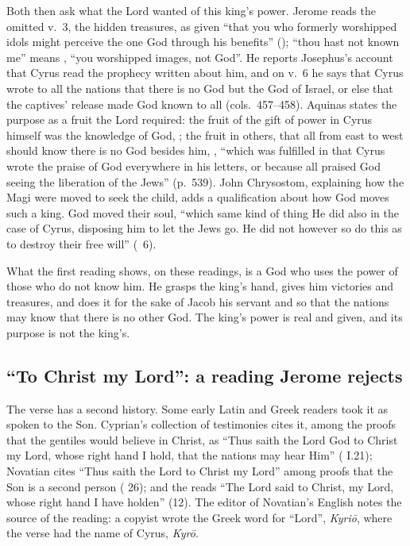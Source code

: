 Both then ask what the Lord wanted of this king's power. Jerome reads the
omitted v.~3, the hidden treasures, as given ``that you who formerly
worshipped idols might perceive the one God through his benefits''
(); ``thou
hast not known me'' means , ``you
worshipped images, not God''. He reports Josephus's account that Cyrus read
the prophecy written about him, and on v.~6 he says that Cyrus wrote to all
the nations that there is no God but the God of Israel, or else that the
captives' release made God known to all (cols.~457--458). Aquinas states the
purpose as a fruit the Lord required: the fruit of the gift of power in Cyrus
himself was the knowledge of God, ; the fruit in
others, that all from east to west should know there is no God besides him,
,
``which was fulfilled in that Cyrus wrote the praise of God everywhere in his
letters, or because all praised God seeing the liberation of the Jews''
(p.~539). John Chrysostom, explaining how the Magi were moved to seek the
child, adds a qualification about how God moves such a king. God moved their
soul, ``which same kind of thing He did also in the case of Cyrus, disposing
him to let the Jews go. He did not however so do this as to destroy their free
will'' (~6).

What the first reading shows, on these readings, is a God who uses the power of
those who do not know him. He grasps the king's hand, gives him victories and
treasures, and does it for the sake of Jacob his servant and so that the
nations may know that there is no other God. The king's power is real and given,
and its purpose is not the king's.

\subsection{``To Christ my Lord'': a reading Jerome rejects}

The verse has a second history. Some early Latin and Greek readers took it as
spoken to the Son. Cyprian's collection of testimonies cites it, among the
proofs that the gentiles would believe in Christ, as ``Thus saith the Lord God
to Christ my Lord, whose right hand I hold, that the nations may hear Him''
( I.21); Novatian cites ``Thus saith the Lord to Christ my
Lord'' among proofs that the Son is a second person ( 26);
and the  reads ``The Lord said to Christ, my Lord,
whose right hand I have holden'' (12). The editor of Novatian's English notes
the source of the reading: a copyist wrote the Greek word for ``Lord'',
\textit{Kyri\=o}, where the verse had the name of Cyrus, \textit{Kyr\=o}.


